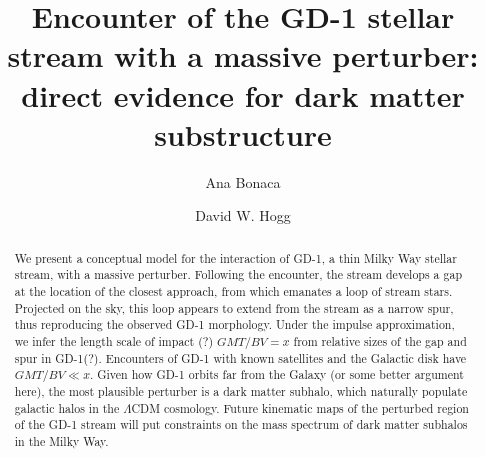 \documentclass[12pt, modern]{aastex62h}
\begin{document}
\sloppy\sloppypar\raggedbottom\frenchspacing

\noindent
\title{Encounter of the GD-1 stellar stream with a massive perturber: direct evidence for dark matter substructure}


\author[0000-0002-7846-9787]{Ana Bonaca}

\author[0000-0003-2866-9403]{David W. Hogg}

\begin{abstract}\noindent
We present a conceptual model for the interaction of GD-1, a thin Milky Way stellar stream, with a massive perturber.
Following the encounter, the stream develops a gap at the location of the closest approach, from which emanates a loop of stream stars.
Projected on the sky, this loop appears to extend from the stream as a narrow spur, %
thus reproducing the observed GD-1 morphology.
Under the impulse approximation, we infer the length scale of impact (?) $GMT/BV = x$ from relative sizes of the gap and spur in GD-1(?).
Encounters of GD-1 with known satellites and the Galactic disk have $GMT/BV \ll x$.
Given how GD-1 orbits far from the Galaxy (or some better argument here), the most plausible perturber is a dark matter subhalo, which naturally populate galactic halos in the $\Lambda$CDM cosmology.
Future kinematic maps of the perturbed region of the GD-1 stream will put constraints on the mass spectrum of dark matter subhalos in the Milky Way.

% 
\end{abstract}
\end{document}
